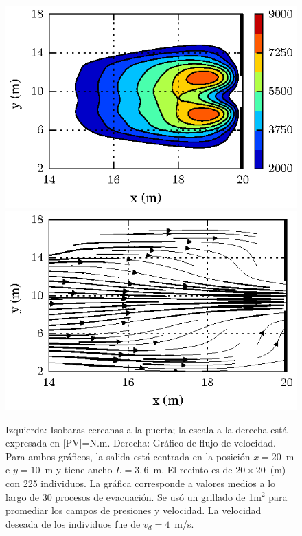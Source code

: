 \begin{figure}[H]
    \centering
    \includegraphics[scale=1.17]{figuras/press_225p_v4_onedoor_3_6.eps}
    \hfill
        \includegraphics[scale=1.17]{figuras/flujo_door_3_6m.eps}
    \caption[width=5cm]{Izquierda: Isobaras cercanas a la puerta; la escala a la derecha está expresada en [PV]=N.m. Derecha: Gráfico de flujo de velocidad. Para ambos gráficos, la salida está centrada en la posición $x=20$~m e $y=10$~m y tiene ancho $L=3,6$~m. El recinto es de $20\times 20$~(m) con 225 individuos. La gráfica corresponde a valores medios a lo largo de 30 procesos de evacuación. Se usó un grillado de 1m$^2$ para promediar los campos de presiones y velocidad. La velocidad deseada de los individuos fue de $v_d=4$~m/s.}
    \label{isobaras_flujo_3_6m}
\end{figure}

